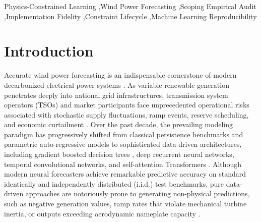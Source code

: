 \documentclass[preprint,3p,times]{elsarticle}
\begin{document}
\begin{frontmatter}
\begin{abstract}
across five random seeds and multiple perturbation regimes demonstrates that physical constraints act primarily as defensive safety guardrails under severe sensor corruption ($\sigma \in \{0.2, 0.4, 0.6\}$) rather than clean-data accuracy boosters. We conclude by presenting an institutional ten-item Constraint Lifecycle Reporting Checklist to guide transparent, reproducible future inquiry.
\end{abstract}

\begin{keyword}
Physics-Constrained Learning \sep Wind Power Forecasting \sep Scoping Empirical Audit \sep Implementation Fidelity \sep Constraint Lifecycle \sep Machine Learning Reproducibility
\end{keyword}

\end{frontmatter}

\section{Introduction}
\label{sec:intro}

Accurate wind power forecasting is an indispensable cornerstone of modern decarbonized electrical power systems \cite{holttinen2021,yan2016review}. As variable renewable generation penetrates deeply into national grid infrastructures, transmission system operators (TSOs) and market participants face unprecedented operational risks associated with stochastic supply fluctuations, ramp events, reserve scheduling, and economic curtailment \cite{zhang2014wind,weron2014}. Over the past decade, the prevailing modeling paradigm has progressively shifted from classical persistence benchmarks and parametric auto-regressive models to sophisticated data-driven architectures, including gradient boosted decision trees \cite{ke2017lightgbm}, deep recurrent neural networks, temporal convolutional networks, and self-attention Transformers \cite{zhou2021informer,wang2024timemixer,liu2024itransformer}. Although modern neural forecasters achieve remarkable predictive accuracy on standard identically and independently distributed (i.i.d.) test benchmarks, pure data-driven approaches are notoriously prone to generating non-physical predictions, such as negative generation values, ramp rates that violate mechanical turbine inertia, or outputs exceeding aerodynamic nameplate capacity \cite{karniadakis2021physics}.
\end{document}
